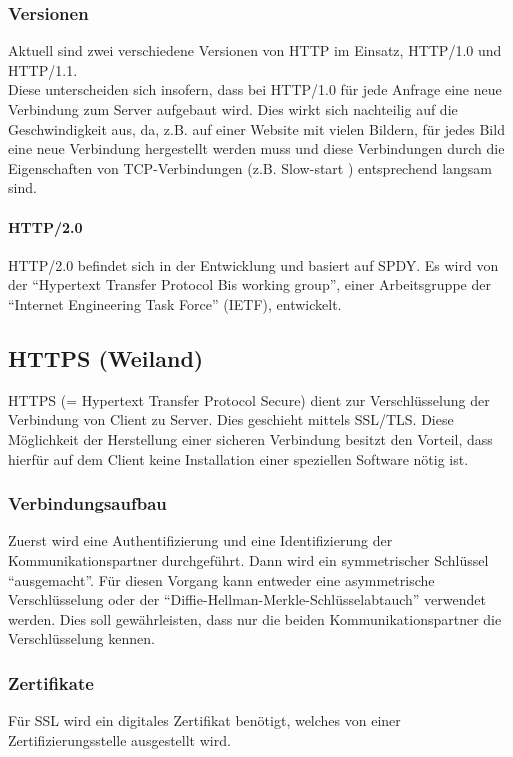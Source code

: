 \subsubsection{Versionen}
Aktuell sind zwei verschiedene Versionen von HTTP im Einsatz, HTTP/1.0 und HTTP/1.1.
\\
Diese unterscheiden sich insofern, dass bei HTTP/1.0 für jede Anfrage eine neue Verbindung zum Server aufgebaut wird. Dies wirkt sich nachteilig auf die Geschwindigkeit aus, da, z.B. auf einer Website mit vielen Bildern, für jedes Bild eine neue Verbindung hergestellt werden muss und diese Verbindungen durch die Eigenschaften von TCP-Verbindungen (z.B. Slow-start ) entsprechend langsam sind.

\paragraph{HTTP/2.0}  HTTP/2.0 befindet sich in der Entwicklung und basiert auf SPDY. Es wird von der \enquote{Hypertext Transfer Protocol Bis working group}, einer Arbeitsgruppe der \enquote{Internet Engineering Task Force} (IETF), entwickelt.

\subsection{HTTPS (Weiland)}
HTTPS (= Hypertext Transfer Protocol Secure) dient zur Verschlüsselung der Verbindung von Client zu Server. Dies geschieht mittels SSL/TLS. Diese Möglichkeit der Herstellung einer sicheren Verbindung besitzt den Vorteil, dass hierfür auf dem Client keine Installation einer speziellen Software nötig ist.
\subsubsection{Verbindungsaufbau}
Zuerst wird eine Authentifizierung und eine Identifizierung der Kommunikationspartner durchgeführt. Dann wird ein symmetrischer Schlüssel \enquote{ausgemacht}. Für diesen Vorgang kann entweder eine asymmetrische Verschlüsselung oder der \enquote{Diffie-Hellman-Merkle-Schlüsselabtauch} verwendet werden. Dies soll gewährleisten, dass nur die beiden Kommunikationspartner die Verschlüsselung kennen.
\subsubsection{Zertifikate}
Für SSL wird ein digitales Zertifikat benötigt, welches von einer Zertifizierungsstelle ausgestellt wird.
